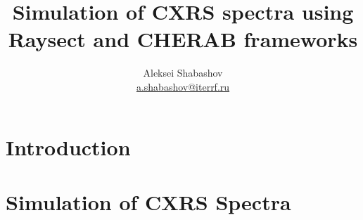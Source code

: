 \documentclass[a4paper,12pt,titlepage,english,draft]{article}
\title{Simulation of CXRS spectra using Raysect and CHERAB frameworks}
\author{Aleksei Shabashov \\ \href{mailto:a.shabashov@iterrf.ru}{a.shabashov@iterrf.ru}}
\date{}
\begin{document}
\maketitle
\tableofcontents%

% 

% 

% 

\section{Introduction}%
\label{sec:introduction}


\section{Simulation of CXRS Spectra}%
\label{sec:simulation}


% 

\printbibliography%

%     

%     
\end{document}
